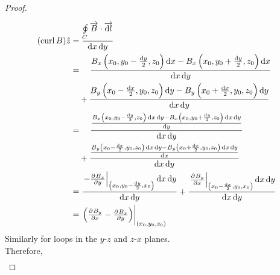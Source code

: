 \documentclass[fleqn, a4paper, 12pt, twoside]{article}
\theoremstyle{definition}
\theoremstyle{theorem}
\newcommand{\curl}{\mathrm{curl\,}}
\begin{document}
\begin{proof}
\begin{figure}[H]
	\end{figure}
	\begin{align*}
		(\curl B) \hat{z} & = \frac{\oint\limits_{C} \overrightarrow{B} \cdot \overrightarrow{\dif l}}{\dif x \dif y}                                                                                                                                                  \\
                                  & = \quad \frac{B_x\left( x_0 , y_0 - \frac{\dif y}{2} , z_0 \right) \dif x - B_x\left( x_0 , y_0 + \frac{\dif y}{2} , z_0 \right) \dif x}{\dif x \dif y}                                                                                    \\
                                  & \quad + \frac{B_y\left( x_0 - \frac{\dif x}{2} , y_0 , z_0 \right) \dif y - B_y\left( x_0 + \frac{\dif x}{2}, y_0 , z_0 \right) \dif y}{\dif x \dif y}                                                                                     \\
                                  & = \quad \frac{\frac{B_x\left( x_0 , y_0 - \frac{\dif y}{2} , z_0 \right) \dif x \dif y - B_x\left( x_0 , y_0 + \frac{\dif y}{2} , z_0 \right) \dif x \dif y}{\dif y}}{\dif x \dif y}                                                       \\
                                  & \quad + \frac{\frac{B_y\left( x_0 - \frac{\dif x}{2} , y_0 , z_0 \right) \dif x \dif y - B_y\left( x_0 + \frac{\dif x}{2}, y_0 , z_0 \right) \dif x \dif y}{\dif x}}{\dif x \dif y}                                                        \\
                                  & = \frac{\left. -\pd{B_x}{y} \right|_{\left( x_0 , y_0 - \frac{\dif y}{2} , x_0 \right)} \dif x \dif y}{\dif x \dif y} + \frac{\left. \pd{B_y}{x} \right|_{\left( x_0 - \frac{\dif x}{2} , y_0 , x_0 \right)} \dif x \dif y}{\dif x \dif y} \\
                                  & = \left. \left( \pd{B_y}{x} - \pd{B_x}{y} \right) \right|_{(x_0, y_0, z_0)}
	\end{align*}
	Similarly for loops in the $y$-$z$ and $z$-$x$ planes.\\
	Therefore,
	\begin{align*}

\end{align*}
\end{proof}
\end{document}

